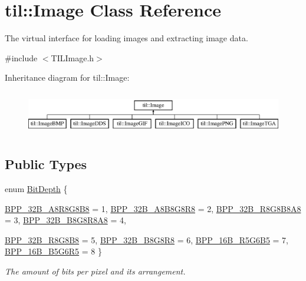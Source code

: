 \hypertarget{classtil_1_1_image}{
\section{til::Image Class Reference}
\label{classtil_1_1_image}
}


The virtual interface for loading images and extracting image data.  




{\ttfamily \#include $<$TILImage.h$>$}

Inheritance diagram for til::Image:\begin{figure}[H]
\begin{center}
\leavevmode
\includegraphics[height=1.964912cm]{classtil_1_1_image}
\end{center}
\end{figure}
\subsection*{Public Types}
\begin{DoxyCompactItemize}
\item 
enum \hyperlink{classtil_1_1_image_a621d337ba744563ed6bde962e08dfbc8}{BitDepth} \{ \par
\hyperlink{classtil_1_1_image_a621d337ba744563ed6bde962e08dfbc8af30c364fa646b255faed30d3a88564b6}{BPP\_\-32B\_\-A8R8G8B8} =  1, 
\hyperlink{classtil_1_1_image_a621d337ba744563ed6bde962e08dfbc8a0bf2ec10c9eed201fbfb41b5cf89b961}{BPP\_\-32B\_\-A8B8G8R8} =  2, 
\hyperlink{classtil_1_1_image_a621d337ba744563ed6bde962e08dfbc8a3ac84308671afc5f9063539355b916c9}{BPP\_\-32B\_\-R8G8B8A8} =  3, 
\hyperlink{classtil_1_1_image_a621d337ba744563ed6bde962e08dfbc8a0b77d25be4ba6617960ca436bd903fa8}{BPP\_\-32B\_\-B8G8R8A8} =  4, 
\par
\hyperlink{classtil_1_1_image_a621d337ba744563ed6bde962e08dfbc8a532664ea0fc09594fb9bddc0bed83120}{BPP\_\-32B\_\-R8G8B8} =  5, 
\hyperlink{classtil_1_1_image_a621d337ba744563ed6bde962e08dfbc8a328e608bddb9f328bf0bd1eae3e54b34}{BPP\_\-32B\_\-B8G8R8} =  6, 
\hyperlink{classtil_1_1_image_a621d337ba744563ed6bde962e08dfbc8aaa9732c2665f568a7fcea882b7b50a7d}{BPP\_\-16B\_\-R5G6B5} =  7, 
\hyperlink{classtil_1_1_image_a621d337ba744563ed6bde962e08dfbc8a8fff22180693d8663db79d0fbc290cac}{BPP\_\-16B\_\-B5G6R5} =  8
 \}
\begin{DoxyCompactList}\small\item\em The amount of bits per pixel and its arrangement. \item\end{DoxyCompactList}\end{DoxyCompactItemize}
